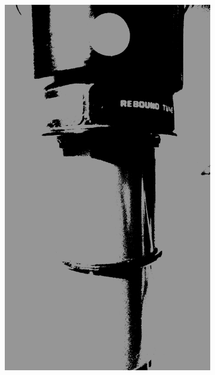 		\begin{figure}[h!]
			\centering
			\begin{subfigure}[t]{0.4\textwidth}
				\centering
				\includegraphics[scale=0.04]{../images/results/threshold.jpg}
				\label{subfig:threshold}
			\end{subfigure}
			\begin{subfigure}[t]{0.4\textwidth}
				\centering

\end{subfigure}
\end{figure}
